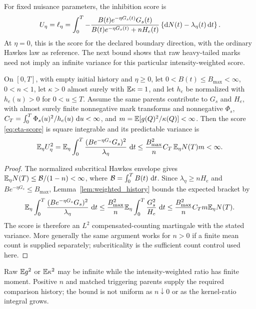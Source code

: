 For fixed nuisance parameters, the inhibition score is
\begin{equation}
U_\eta=\ell_\eta
=\int_0^T
-\frac{B(t)e^{-\eta G_s(t)}G_s(t)}
{B(t)e^{-\eta G_s(t)}+nH_e(t)}
\left\{\mathop{}\!\mathrm{d} N(t)-\lambda_\eta(t)\mathop{}\!\mathrm{d} t\right\}.
\label{eq:eta-score}
\end{equation}
At \(\eta=0\), this is the score for the declared boundary direction, with the ordinary Hawkes law as reference. The next bound shows that raw heavy-tailed marks need not imply an infinite variance for this particular intensity-weighted score.

\begin{proposition}
\label{prop:score_bound}
On \([0,T]\), with empty initial history and \(\eta\geq0\), let \(0<B(t)\le B_{\max}<\infty\), \(0<n<1\), let \(\kappa>0\) almost surely with \(\mathbb{E} \kappa=1\), and let \(h_e\) be normalized with \(h_e(u)>0\) for \(0<u\le T\). Assume the same parents contribute to \(G_s\) and \(H_e\), with almost surely finite nonnegative mark transforms and nonnegative \(\Phi_s\), \(C_T=\int_0^T\Phi_s(u)^2/h_e(u)\,\mathop{}\!\mathrm{d} u<\infty\), and \(m=\mathbb{E} [g(Q)^2/\kappa(Q)]<\infty\). Then the score \eqref{eq:eta-score} is square integrable and its predictable variance is
\[
\mathbb{E} _\eta U_\eta^2
=
\mathbb{E} _\eta\int_0^T
\frac{(B e^{-\eta G_s}G_s)^2}{\lambda_\eta}\,\mathop{}\!\mathrm{d} t
\le
\frac{B_{\max}^2}{n}C_T\,\mathbb{E} _\eta N(T)m<\infty.
\]
\end{proposition}

\begin{proof}
The normalized subcritical Hawkes envelope gives \(\mathbb{E}_\eta N(T)\leq\mathcal B/(1-n)<\infty\), where \(\mathcal B=\int_0^T B(t)\,\mathop{}\!\mathrm{d} t\). Since \(\lambda_\eta\geq nH_e\) and \(Be^{-\eta G_s}\leq B_{\max}\), Lemma~\ref{lem:weighted_history} bounds the expected bracket by
\[
\mathbb{E}_\eta\int_0^T\frac{(Be^{-\eta G_s}G_s)^2}{\lambda_\eta}\,\mathop{}\!\mathrm{d} t
\leq\frac{B_{\max}^2}{n}\mathbb{E}_\eta\int_0^T\frac{G_s^2}{H_e}\,\mathop{}\!\mathrm{d} t
\leq\frac{B_{\max}^2}{n}C_Tm\mathbb{E}_\eta N(T).
\]
The score is therefore an \(L^2\) compensated-counting martingale with the stated variance. More generally the same argument works for \(n>0\) if a finite mean count is supplied separately; subcriticality is the sufficient count control used here.
\end{proof}

Raw \(\mathbb{E}  g^2\) or \(\mathbb{E} \kappa^2\) may be infinite while the intensity-weighted ratio has finite moment. Positive \(n\) and matched triggering parents supply the required comparison history; the bound is not uniform as \(n\downarrow0\) or as the kernel-ratio integral grows.

